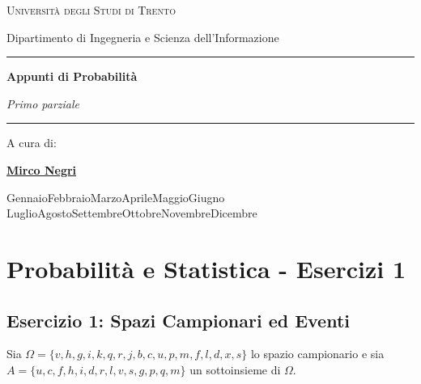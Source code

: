 \documentclass[12pt, a4paper]{article}
\begin{document}
\begin{titlepage}
    \centering
    \vspace*{3cm} 
    
    {\scshape\LARGE Università degli Studi di Trento \par}
    \vspace{0.5cm}
    {\large Dipartimento di Ingegneria e Scienza dell'Informazione \par}
    
    \vspace{2cm}
    
    \rule{\textwidth}{0.8pt}\vspace{0.5cm}
    {\Huge\bfseries Appunti di Probabilità \par}
    \vspace{0.3cm}
    {\Large\itshape Primo parziale \par}
    \vspace{0.4cm}\rule{\textwidth}{0.8pt}
    
    \vspace{3cm}
    
    {\Large A cura di: \par}
    \vspace{0.3cm}
    {\Large \textbf{\href{https://github.com/mirconegri}{Mirco Negri}} \par}
    
    \vfill
    
    {\large
    \ifcase\month\or
    Gennaio\or Febbraio\or Marzo\or Aprile\or Maggio\or Giugno\or
    Luglio\or Agosto\or Settembre\or Ottobre\or Novembre\or Dicembre\fi
    \space \the\year \par
    }
\end{titlepage}

\tableofcontents
\newpage

\section*{Probabilità e Statistica - Esercizi 1}

\subsection*{Esercizio 1: Spazi Campionari ed Eventi}
Sia $\Omega=\{v,h,g,i,k,q,r,j,b,c,u,p,m,f,l,d,x,s\}$ lo spazio campionario e sia \\ $A=\{u,c,f,h,i,d,r,l,v,s,g,p,q,m\}$ un sottoinsieme di $\Omega$.
\end{document}
